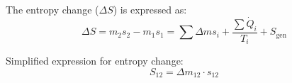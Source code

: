 The entropy change (\( \Delta S \)) is expressed as:  
\[
\Delta S = m_2 s_2 - m_1 s_1 = \sum \Delta m s_i + \frac{\sum \dot{Q}_i}{T_i} + S_{\text{gen}}
\]  

Simplified expression for entropy change:  
\[
S_{12} = \Delta m_{12} \cdot s_{12}
\]